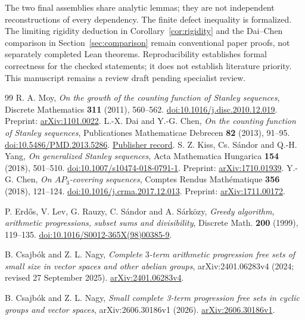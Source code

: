 \documentclass[11pt]{article}
\theoremstyle{definition}\newtheorem{definition}[theorem]{Definition}
\theoremstyle{remark}\newtheorem{remark}[theorem]{Remark}
\numberwithin{equation}{section}
\begin{document}
The two final assemblies share analytic lemmas; they are not independent reconstructions of every dependency. The finite defect inequality is formalized. The limiting rigidity deduction in Corollary~\ref{cor:rigidity} and the Dai--Chen comparison in Section~\ref{sec:comparison} remain conventional paper proofs, not separately completed Lean theorems. Reproducibility establishes formal correctness for the checked statements; it does not establish literature priority. This manuscript remains a review draft pending specialist review.

\begin{thebibliography}{99}\small
{}
R. A. Moy, \emph{On the growth of the counting function of Stanley sequences}, Discrete Mathematics \textbf{311} (2011), 560--562. \href{https://doi.org/10.1016/j.disc.2010.12.019}{doi:10.1016/j.disc.2010.12.019}. Preprint: \href{https://arxiv.org/abs/1101.0022}{arXiv:1101.0022}.
L.-X. Dai and Y.-G. Chen, \emph{On the counting function of Stanley sequences}, Publicationes Mathematicae Debrecen \textbf{82} (2013), 91--95. \href{https://doi.org/10.5486/PMD.2013.5286}{doi:10.5486/PMD.2013.5286}.
\href{https://publi.math.unideb.hu/paper/1750}{Publisher record}.
S. Z. Kiss, Cs. S\'andor and Q.-H. Yang, \emph{On generalized Stanley sequences}, Acta Mathematica Hungarica \textbf{154} (2018), 501--510. \href{https://doi.org/10.1007/s10474-018-0791-1}{doi:10.1007/s10474-018-0791-1}. Preprint: \href{https://arxiv.org/abs/1710.01939}{arXiv:1710.01939}.
Y.-G. Chen, \emph{On $AP_3$-covering sequences}, Comptes Rendus Math\'ematique \textbf{356} (2018), 121--124. \href{https://doi.org/10.1016/j.crma.2017.12.013}{doi:10.1016/j.crma.2017.12.013}. Preprint: \href{https://arxiv.org/abs/1711.00172}{arXiv:1711.00172}.

P. Erd\H{o}s, V. Lev, G. Rauzy, C. S\'andor and A. S\'ark\"ozy,
\emph{Greedy algorithm, arithmetic progressions, subset sums and divisibility},
Discrete Math. \textbf{200} (1999), 119--135.
\href{https://doi.org/10.1016/S0012-365X(98)00385-9}{doi:10.1016/S0012-365X(98)00385-9}.

B. Csajb\'ok and Z. L. Nagy,
\emph{Complete $3$-term arithmetic progression free sets of small size in vector spaces and other abelian groups},
arXiv:2401.06283v4 (2024; revised 27 September 2025).
\href{https://arxiv.org/abs/2401.06283v4}{arXiv:2401.06283v4}.

B. Csajb\'ok and Z. L. Nagy,
\emph{Small complete 3-term progression free sets in cyclic groups and vector spaces},
arXiv:2606.30186v1 (2026).
\href{https://arxiv.org/abs/2606.30186v1}{arXiv:2606.30186v1}.


\end{thebibliography}
\end{document}
